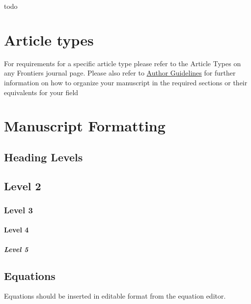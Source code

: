 \documentclass[utf8]{FrontiersinVancouver} %
\begin{document}
todo \citep{las-22-arxiv-workflow-cc}




\section{Article types}

For requirements for a specific article type please refer to the
Article Types on any Frontiers journal page. Please also refer to
\href{https://www.frontiersin.org/about/author-guidelines#sections}{Author
  Guidelines} for further information on how to organize your
manuscript in the required sections or their equivalents for your
field


\section{Manuscript Formatting}

\subsection{Heading Levels}


\subsection{Level 2}
\subsubsection{Level 3}
\paragraph{Level 4}
\subparagraph{Level 5}

\subsection{Equations}
Equations should be inserted in editable format from the equation editor.
\end{document}

